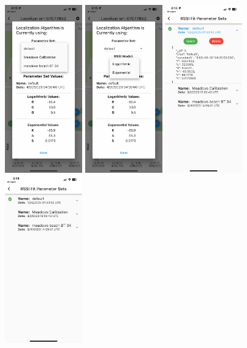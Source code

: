 \documentclass[
]{article}
\begin{document}
\includegraphics[width=0.25\textwidth,height=\textheight]{./images/sk_localization_chooseParam.PNG}
\includegraphics[width=0.25\textwidth,height=\textheight]{./images/sk_localization_chooseModel.PNG}
\includegraphics[width=0.25\textwidth,height=\textheight]{./images/sk_localization_paramDesc.PNG}
\includegraphics[width=0.25\textwidth,height=\textheight]{./images/sk_localization_ParamSets.PNG}
\end{document}
